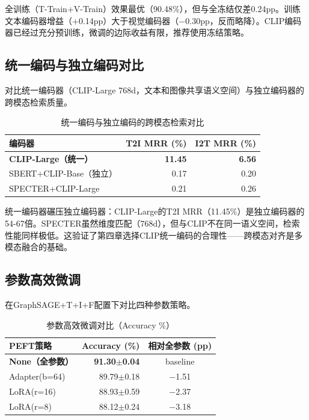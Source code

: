 全训练（T-Train+V-Train）效果最优（90.48\%），但与全冻结仅差0.24pp。训练文本编码器增益（+0.14pp）大于视觉编码器（$-$0.30pp，反而略降）。CLIP编码器已经过充分预训练，微调的边际收益有限，推荐使用冻结策略。

\subsection{统一编码与独立编码对比}

对比统一编码器（CLIP-Large 768d，文本和图像共享语义空间）与独立编码器的跨模态检索质量。

\begin{table}[htbp]
  \centering
  \caption{统一编码与独立编码的跨模态检索对比}
  \label{tab:encoding_compare}
  \begin{tabular}{lrr}
    \toprule
    编码器 & T2I MRR (\%) & I2T MRR (\%) \\
    \midrule
    \textbf{CLIP-Large（统一）} & \textbf{11.45} & \textbf{6.56} \\
    SBERT+CLIP-Base（独立） & 0.17 & 0.20 \\
    SPECTER+CLIP-Large & 0.21 & 0.26 \\
    \bottomrule
  \end{tabular}
\end{table}

统一编码器碾压独立编码器：CLIP-Large的T2I MRR（11.45\%）是独立编码器的54-67倍。SPECTER虽然维度匹配（768d），但与CLIP不在同一语义空间，检索性能同样极低。这验证了第四章选择CLIP统一编码的合理性——跨模态对齐是多模态融合的基础。

\subsection{参数高效微调}

在GraphSAGE+T+I+F配置下对比四种参数策略。

\begin{table}[htbp]
  \centering
  \caption{参数高效微调对比（Accuracy \%）}
  \label{tab:peft}
  \begin{tabular}{lrc}
    \toprule
    PEFT策略 & Accuracy (\%) & 相对全参数 (pp) \\
    \midrule
    \textbf{None（全参数）} & \textbf{91.30$\pm$0.04} & baseline \\
    Adapter(b=64) & 89.79$\pm$0.18 & $-$1.51 \\
    LoRA(r=16) & 88.93$\pm$0.59 & $-$2.37 \\
    LoRA(r=8) & 88.12$\pm$0.24 & $-$3.18 \\
    \bottomrule
  \end{tabular}
\end{table}

